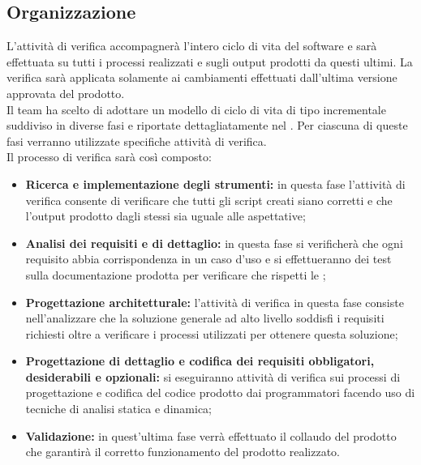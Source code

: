 	\subsection{Organizzazione}
	L'attività di verifica accompagnerà l'intero ciclo di vita del software e sarà effettuata su tutti i processi realizzati e sugli output prodotti da questi ultimi. La verifica sarà applicata solamente ai cambiamenti effettuati dall'ultima versione approvata del prodotto.\\
	Il team ha scelto di adottare un modello di ciclo di vita di tipo incrementale suddiviso in diverse fasi e riportate dettagliatamente nel \docNameVersionPdP. Per ciascuna di queste fasi verranno utilizzate specifiche attività di verifica.\\ Il processo di verifica sarà così composto:
	\begin{itemize}
		\item \textbf{Ricerca e implementazione degli strumenti:}  in questa fase l'attività di verifica consente di verificare che tutti gli script creati siano corretti e che l'output prodotto dagli stessi sia uguale alle aspettative;
		\item \textbf{Analisi dei requisiti e di dettaglio:} in questa fase si verificherà che ogni requisito abbia corrispondenza in un caso d'uso e si effettueranno dei test sulla documentazione prodotta per verificare che rispetti le \docNameVersionNdP;
		\item \textbf{Progettazione architetturale:} l'attività di verifica in questa fase consiste nell'analizzare che la soluzione generale ad alto livello soddisfi i requisiti richiesti oltre a verificare i processi utilizzati per ottenere questa soluzione;
		\item \textbf{Progettazione di dettaglio e codifica dei requisiti obbligatori, desiderabili e opzionali:} si eseguiranno attività di verifica sui processi di progettazione e codifica del codice prodotto dai programmatori facendo uso di tecniche di analisi statica e dinamica;
		\item \textbf{Validazione:} in quest'ultima fase verrà effettuato il collaudo del prodotto che garantirà il corretto funzionamento del prodotto realizzato.
	\end{itemize}
	
